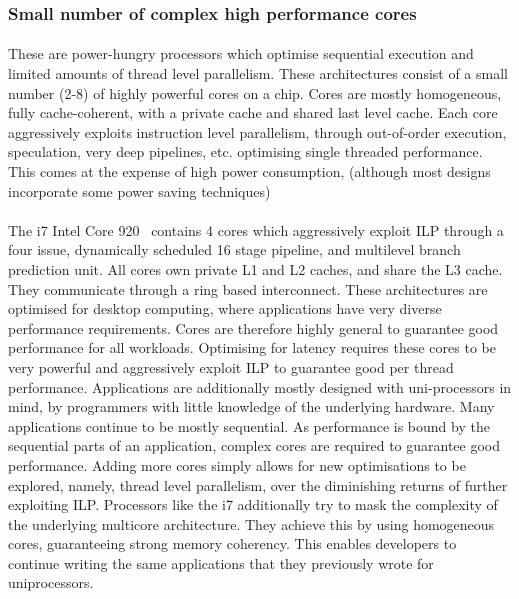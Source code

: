 \subsubsection{Small number of complex high performance cores}
\paragraph{} These are power-hungry processors which optimise sequential execution
and limited amounts of thread level parallelism. These architectures 
consist of a small number (2-8) of highly powerful cores on a 
chip. Cores are mostly homogeneous, fully cache-coherent, with a private cache 
and shared last level cache. 
Each core aggressively exploits instruction level parallelism, through
out-of-order execution, speculation, very deep pipelines, etc. optimising
single threaded performance. This comes at the expense of high power consumption, 
(although most designs incorporate some power
saving techniques)~\cite{Vajda:1414193,Borkar:2007:TCC:1278480.1278667}
\paragraph{} The i7 Intel Core 920~\cite{rotem2012pai} contains 4 cores which aggressively exploit ILP through a four issue, dynamically scheduled 16 stage pipeline, and multilevel branch prediction unit. All cores own
 private L1 and L2 caches, and share the L3 cache. They communicate
through a ring based interconnect. These architectures are
optimised for desktop computing, where applications have very diverse performance requirements. Cores are therefore highly general to guarantee good performance for all workloads. Optimising for latency requires these cores to be very powerful  and aggressively exploit ILP to guarantee good per thread performance. Applications are additionally mostly designed with uni-processors in mind, by programmers with little knowledge of the underlying hardware. Many applications continue to be mostly sequential. As performance is bound by the sequential parts of an application, 
complex cores are required to guarantee good performance.
Adding more cores simply allows for new optimisations to be explored, namely, 
thread level parallelism, over the diminishing returns of further exploiting ILP.
Processors like the i7 additionally try to mask the complexity of the underlying 
multicore architecture. They achieve this by using homogeneous cores, guaranteeing
strong memory coherency. This enables developers to continue writing
the same applications that they previously wrote for uniprocessors.


